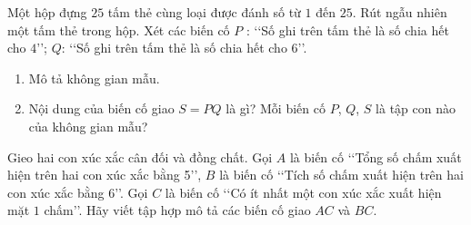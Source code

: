 \begin{vd}%
	Một hộp đựng $25$ tấm thẻ cùng loại được đánh số từ $1$ đến $25$. Rút ngẫu nhiên một tấm thẻ trong hộp. Xét các biến cố $P$ : \lq\lq  Số ghi trên tấm thẻ là số chia hết cho $4$\rq\rq; $Q$: \lq\lq  Số ghi trên tấm thẻ là số chia hết cho $6$\rq\rq.
	\begin{enumerate}
		\item Mô tả không gian mẫu.
		\item Nội dung của biến cố giao $S=P Q$ là gì? Mỗi biến cố $P$, $Q$, $S$ là tập con nào của không gian mẫu?
	\end{enumerate} 
\end{vd}
\begin{vd}%
	Gieo hai con xúc xắc cân đối và đồng chất. Gọi $A$ là biến cố \lq\lq  Tổng số chấm xuất hiện trên hai con xúc xắc bằng 5\rq\rq, $B$ là biến cố \lq\lq  Tích số chấm xuất hiện trên hai con xúc xắc bằng 6\rq\rq. Gọi $C$ là biến cố \lq\lq  Có ít nhất một con xúc xắc xuất hiện mặt $1$ chấm\rq\rq. Hãy viết tập hợp mô tả các biến cố giao $AC$ và $BC$.
\end{vd}

